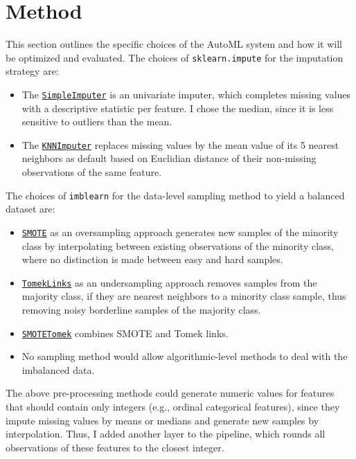\documentclass[11pt]{article}
\begin{document}
\section{Method}

This section outlines the specific choices of the AutoML system and how it will be optimized and evaluated. The choices of \texttt{sklearn.impute} for the imputation strategy are:
\begin{itemize}
\item The \href{https://scikit-learn.org/stable/modules/generated/sklearn.impute.SimpleImputer.html}{\texttt{SimpleImputer}} is an univariate imputer, which completes missing values with a descriptive statistic per feature. I chose the median, since it is less sensitive to outliers than the mean.
\item The \href{https://scikit-learn.org/stable/modules/generated/sklearn.impute.KNNImputer.html#sklearn.impute.KNNImputer}{\texttt{KNNImputer}} replaces missing values by the mean value of its 5 nearest neighbors as default based on Euclidian distance of their non-missing observations of the same feature. 
\end{itemize}

The choices of \texttt{imblearn} for the data-level sampling method to yield a balanced dataset are:
\begin{itemize}
\item \href{https://imbalanced-learn.org/stable/references/generated/imblearn.over_sampling.SMOTE.html}{\texttt{SMOTE}} as an oversampling approach generates new samples of the minority class by interpolating between existing observations of the minority class, where no distinction is made between easy and hard samples. 
\item \href{https://imbalanced-learn.org/stable/references/generated/imblearn.under_sampling.TomekLinks.html}{\texttt{TomekLinks}} as an undersampling approach removes samples from the majority class, if they are nearest neighbors to a minority class sample, thus removing noisy borderline samples of the majority class. 
\item \href{https://imbalanced-learn.org/stable/references/generated/imblearn.combine.SMOTETomek.html}{\texttt{SMOTETomek}} combines SMOTE and Tomek links.
\item No sampling method would allow algorithmic-level methods to deal with the imbalanced data. 
\end{itemize}

The above pre-processing methods could generate numeric values for features that should contain only integers (e.g., ordinal categorical features), since they impute missing values by means or medians and generate new samples by interpolation. Thus, I added another layer to the pipeline, which rounds all observations of these features to the closest integer. \\
\end{document}
